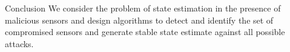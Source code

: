 \documentclass{beamer}
\begin{document}
% 

\begin{frame}{Conclusion}
  We consider the problem of state estimation in the presence of malicious sensors and design algorithms to detect and identify the set of compromised sensors and generate stable state estimate against all possible attacks.
\end{frame}
\end{document}
